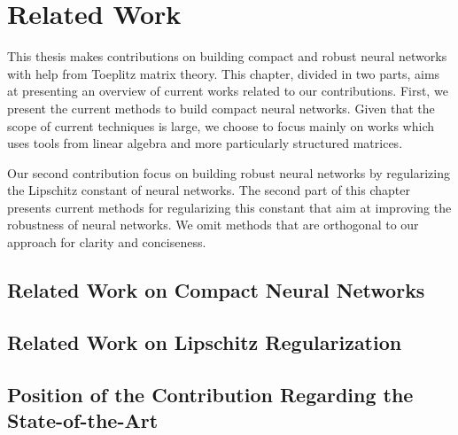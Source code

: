 \chapter{Related Work}
\label{chapter:ch3-related_work}
\localtoc
\vspace{1cm}


This thesis makes contributions on building compact and robust neural networks with help from Toeplitz matrix theory.
This chapter, divided in two parts, aims at presenting an overview of current works related to our contributions.
First, we present the current methods to build compact neural networks.  
Given that the scope of current techniques is large, we choose to focus mainly on works which uses tools from linear algebra and more particularly structured matrices.

Our second contribution focus on building robust neural networks by regularizing the Lipschitz constant of neural networks.
The second part of this chapter presents current methods for regularizing this constant that aim at improving the robustness of neural networks.
We omit methods that are orthogonal to our approach for clarity and conciseness.


\section{Related Work on Compact Neural Networks}
\label{section:ch3-related_work_on_compact_neural_networks}


\section{Related Work on Lipschitz Regularization}
\label{section:ch3-related_work_on_lipschitz_regularization}


\section{Position of the Contribution Regarding the State-of-the-Art}
\label{section:ch3-position_of_the_contribution_regarding_the_state-of-the-art}

